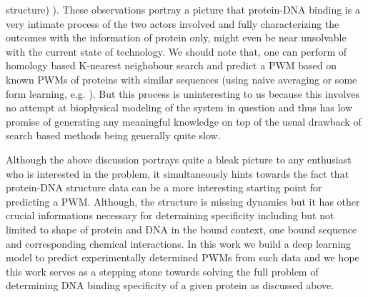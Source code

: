 structure) ). These observations
portray a picture that protein-DNA binding is a very intimate process of the two actors involved and
fully characterizing the outcomes with the information of protein only, might even be near
unsolvable with the current state of technology. We should note that, one can perform
of homology based K-nearest neighobour search and predict a PWM based on known 
PWMs of proteins with similar sequences (using naive averaging or some form learning, e.g. \citet{schroder2010predicting}). 
But this process is uninteresting to us because this involves no attempt at biophysical modeling of the system in question and thus has low promise of
generating any meaningful knowledge on top of the usual drawback of search based methods being
generally quite slow.
\par
Although the above discussion portrays quite a bleak picture to any enthusiast who is interested in
the problem, it simultaneously hints towards the fact that protein-DNA structure data can be a more
interesting starting point for predicting a PWM. Although, the structure is missing dynamics but it
has other crucial informations necessary for determining specificity including but not limited to
shape of protein and DNA in the bound context, one bound sequence and corresponding chemical
interactions. In this work we build a deep learning model to predict experimentally determined PWMs
from such data and we hope this work serves as a stepping stone towards solving the full problem of
determining DNA  binding specificity of a given protein as discussed above.
\par
